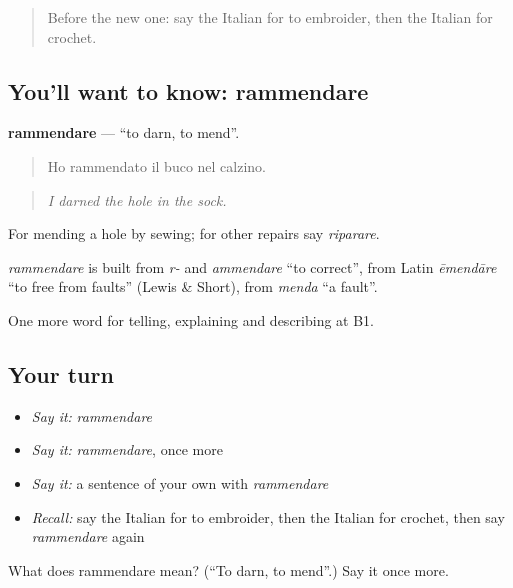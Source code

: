 \begin{quote}
Before the new one: say the Italian for to embroider, then the Italian for crochet.
\end{quote}

\subsection*{You'll want to know: rammendare}
\textbf{rammendare} — \textquotedblleft{}to darn, to mend\textquotedblright{}.

\begin{quote}
Ho rammendato il buco nel calzino.
\end{quote}

\begin{quote}
\emph{I darned the hole in the sock.}
\end{quote}

For mending a hole by sewing; for other repairs say \emph{riparare}.

\begin{cousinweb}
\emph{rammendare} is built from \emph{r-} and \emph{ammendare} \textquotedblleft{}to correct\textquotedblright{}, from Latin \emph{ēmendāre} \textquotedblleft{}to free from faults\textquotedblright{} (Lewis \& Short), from \emph{menda} \textquotedblleft{}a fault\textquotedblright{}.
\end{cousinweb}

\begin{grammarlens}[title={What you've built}]
One more word for telling, explaining and describing at B1.
\end{grammarlens}

\subsection*{Your turn}
\begin{itemize}
\raggedright
  \item \emph{Say it:} \emph{rammendare}
  \item \emph{Say it:} \emph{rammendare}, once more
  \item \emph{Say it:} a sentence of your own with \emph{rammendare}
  \item \emph{Recall:} say the Italian for to embroider, then the Italian for crochet, then say \emph{rammendare} again
\end{itemize}

\begin{tcolorbox}[breakable,colback=teal!4,colframe=teal!35!black,title={Before you move on}]
What does rammendare mean? (\textquotedblleft{}To darn, to mend\textquotedblright{}.) Say it once more.
\end{tcolorbox}
